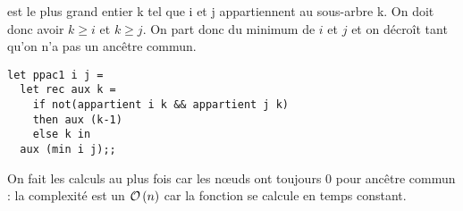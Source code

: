 \begin{Exercise}
 est le plus grand entier k tel que i et j appartiennent au sous-arbre k. On doit donc avoir $k \ge i$ et $k\ge j$. On part donc du minimum de $i$ et $j$ et on décroît tant qu'on n'a pas un ancêtre commun.

\begin{lstlisting}
let ppac1 i j =
  let rec aux k =
    if not(appartient i k && appartient j k)
    then aux (k-1)
    else k in
  aux (min i j);;
 \end{lstlisting}
 
 On fait les calculs au plus  fois car les nœuds ont toujours 0 pour ancêtre commun : la complexité est un ${\cal O}\left(n\right)$ car la fonction  se calcule en temps constant.
\end{Exercise}
